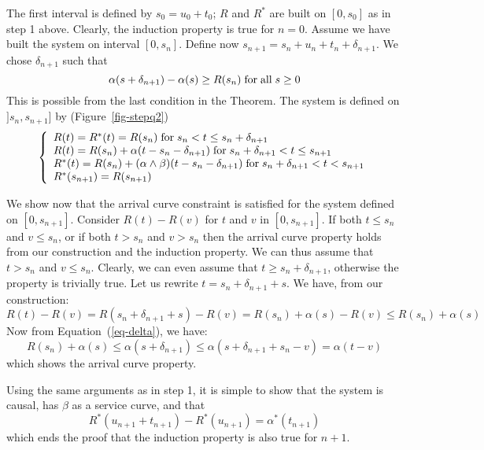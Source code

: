 The first interval is defined by $s_0= u_0+t_0$; $R$ and $R^*$ are
built on $[0,s_0]$ as in step 1 above. Clearly, the induction
property is true for $n=0$. Assume we have built the system on
interval $[0,s_n]$. Define now $s_{n+1}= s_n + u_n + t_n +
\delta_{n+1}$. We chose $\delta_{n+1}$ such that
\begin{equation}\mylabel{eq-delta}
  \alpha(s+\delta_{n+1}) - \alpha(s) \geq R(s_n) \mfa s \geq 0
\end{equation}
This is possible from the last condition in the Theorem. The
system is defined on $]s_n, s_{n+1}]$ by (Figure~\ref{fig-stepq2})
 $$
 \left\{\begin{array}{l} 
 R(t) = R^*(t) = R(s_n) \mathrm{\; for \; } s_n < t \leq s_n + \delta_{n+1}\\
 R(t) = R(s_n) + \alpha(t- s_n - \delta_{n+1}) \mathrm{\; for \; } s_n + \delta_{n+1} < t \leq s_{n+1}\\
 R^*(t) = R(s_n) + (\alpha \wedge \beta) (t- s_n - \delta_{n+1}) \mathrm{\; for \; } s_n + \delta_{n+1} < t <
 s_{n+1}\\
 R^*(s_{n+1}) = R(s_{n+1})
  \end{array} \right.
 $$
\begin{figure}[htbp]
\end{figure}
We show now that the arrival curve constraint is satisfied for the
system defined on $[0,s_{n+1}]$. Consider $R(t)-R(v)$ for $t$ and
$v$ in $[0,s_{n+1}]$. If both $t \leq s_n$ and $v \leq s_n$, or if
both $t
> s_n$ and $v > s_n$ then the arrival curve property holds from
our construction and the induction property. We can thus assume
that $t>s_n$ and $v\leq s_n$. Clearly, we can even assume that $t
\geq s_n + \delta_{n+1}$, otherwise the property is trivially
true. Let us rewrite $t=s_n + \delta_{n+1} + s$. We have, from our
construction:
 $$
 R(t) -R(v)= R(s_n + \delta_{n+1} + s) - R(v) = R(s_n) + \alpha(s) -R(v)
 \leq R(s_n) + \alpha(s)
 $$
Now from Equation~(\ref{eq-delta}), we have:
 $$
 R(s_n) + \alpha(s)\leq \alpha(s+\delta_{n+1}) \leq \alpha(s+\delta_{n+1} +
 s_n - v) = \alpha(t-v)
 $$
which shows the arrival curve property.

Using the same arguments as in step 1, it is simple to show that
the system is causal, has $\beta$ as a service curve, and that
 $$
 R^*(u_{n+1}+t_{n+1})-R^*(u_{n+1})= \alpha^*(t_{n+1})
 $$
which ends the proof that the induction property is also true for
$n+1$.


